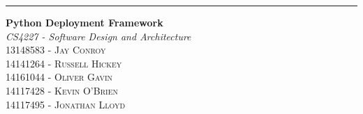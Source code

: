 \begin{titlepage}
	\raggedleft

	\rule{1pt}{\textheight}
	\hspace{0.05\textwidth}
	\parbox[b]{0.75\textwidth}{

		{\Huge\bfseries Python Deployment Framework}\\[2\baselineskip]
		{\large\textit{CS4227 - Software Design and Architecture}}\\[4\baselineskip]
		{\Large\textsc{13148583 - Jay Conroy}}\\[1\baselineskip]
		{\Large\textsc{14141264 - Russell Hickey}}\\[1\baselineskip]
		{\Large\textsc{14161044 - Oliver Gavin}}\\[1\baselineskip]
		{\Large\textsc{14117428 - Kevin O'Brien}}\\[1\baselineskip]
		{\Large\textsc{14117495 - Jonathan Lloyd}}\\[1\baselineskip]
		\vspace{0.25\textheight}
	}
\end{titlepage}
